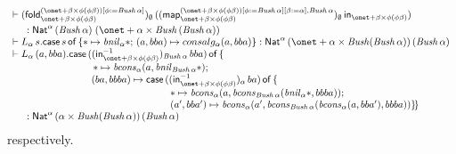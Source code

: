 \documentclass{lmcs}
\theoremstyle{plain}\newtheorem{satz}[thm]{Satz}
\newcommand{\fold}{\mathsf{fold}}
\newcommand{\ininv}[2]{(\tin^{-1}_{\onet +
  \beta \times \phi (\phi\beta)})_{#1}\, #2}
\newcommand{\map}{\mathsf{map}}
\begin{document}
{\[\begin{array}{l}
\vdash (\fold_{\onet + \beta \times \phi (\phi\beta)}^{(\onet + \beta
  \times \phi (\phi\beta))[\phi := \mathit{Bush}\,\alpha]})_\emptyset\,
((\map_{\onet + \beta \times \phi (\phi\beta)}^{(\onet + \beta \times
  \phi (\phi\beta))[\phi := \mathit{Bush}\,\alpha][\beta := \alpha],
  \mathit{Bush}\,\alpha})_\emptyset\, \tin_{\onet + \beta \times \phi
  (\phi\beta)})\\[0.05in]
\hspace*{0.2in} : \Nat^{\alpha}\, (\mathit{Bush}\,\alpha)\; (\onet +
\alpha \times \mathit{Bush}\,(\mathit{Bush}\,\alpha))\\ 
  \vdash L_{\alpha} \, s. 
  \cse{s}{* \mapsto \mathit{bnil}_\alpha *}{(a, bba) \mapsto consalg_\alpha (a, bba)}
  : \Nat^\alpha \, (\onet + \alpha \times \mathit{Bush} (\mathit{Bush} \,\alpha)) \, (\mathit{Bush}\,\alpha) \\
  \vdash L_{\alpha} \, (a, bba).  
  \mathsf{case}\, (\ininv{\mathit{Bush}\,\alpha}{bba})\, \mathsf{of}\,\{
  \\
  \hspace{8em}\, * \mapsto \mathit{bcons}_{\alpha} (a,\mathit{bnil}_{\mathit{Bush}\,\alpha} *);  \\
  \hspace{8em} (ba, bbba) \mapsto \mathsf{case}\, (\ininv{\alpha}{ba})
  \, \mathsf{of}\,\{  \\ 
  \hspace{16em}* \mapsto \mathit{bcons}_\alpha (a, \mathit{bcons}_{\mathit{Bush}\,\alpha} 
        (\mathit{bnil}_\alpha *, bbba)) ;  \\ 
  \hspace{16em}(a', bba') \mapsto \mathit{bcons}_\alpha (a', \mathit{bcons}_{\mathit{Bush}\,\alpha}
  (\mathit{bcons}_\alpha (a, bba'), bbba)) \} \! \}\\    
\hspace*{0.2in} : \Nat^\alpha \, (\alpha \times \mathit{Bush} (\mathit{Bush} \,\alpha)) \, (\mathit{Bush}\,\alpha) \\
\end{array}\]
respectively. 

}
\end{document}
